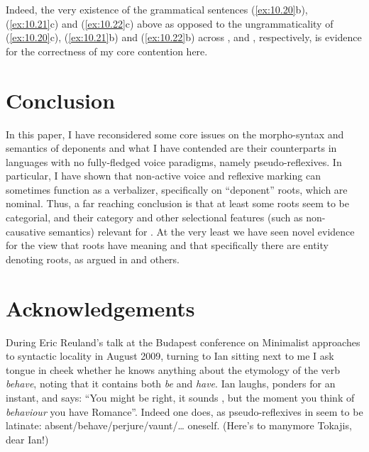 \documentclass[output=paper]{langsci/langscibook}
\begin{document}
Indeed, the very existence of the grammatical sentences (\ref{ex:10.20}b),
(\ref{ex:10.21}c) and (\ref{ex:10.22}c) above as opposed to the
ungrammaticality of (\ref{ex:10.20}c), (\ref{ex:10.21}b) and
(\ref{ex:10.22}b) across ,  and , respectively, is
evidence for the correctness of my core contention here.

\section{Conclusion}\label{sec:10.5}

In this paper, I have reconsidered some core issues on the morpho-syntax and
semantics of deponents and what I have contended are their counterparts in
languages with no fully-fledged voice paradigms, namely pseudo-reflexives. In
particular, I have shown that non-active voice and reflexive marking can
sometimes function as a verbalizer, specifically on \enquote{deponent} roots,
which are nominal. Thus, a far reaching conclusion is that at least some roots
seem to be categorial, and their category and other selectional features (such
as non-causative semantics) relevant for . At the very least we have
seen novel evidence for the view that roots have meaning and that specifically
there are entity denoting roots, as argued in \citet{Harley2005,Levinson2007}
and others.

\makeatletter
{\renewenvironment{theglossary}%
  {\begin{multicols}{3}\raggedright\def\@gls@prevlevel{-1}}{\par\end{multicols}}
  \printchapterglossary{}}
\makeatother

\section*{Acknowledgements}

During Eric Reuland’s talk at the Budapest conference on Minimalist approaches
to syntactic locality in August 2009, turning to Ian sitting next to me I ask
tongue in cheek whether he knows anything about the etymology of the verb
\textit{behave}, noting that it contains both \textit{be} and \textit{have}.
Ian laughs, ponders for an instant, and says: “You might be right, it sounds ,
but the moment you think of \textit{behaviour} you have Romance”. Indeed one does, as
pseudo-reflexives in  seem to be latinate:
absent\slash behave\slash perjure\slash vaunt\slash\dots{} oneself.
(Here’s to many\linebreak more Tokajis, dear Ian!)

{\sloppy\printbibliography[heading=subbibliography,notkeyword=this]}
\end{document}
